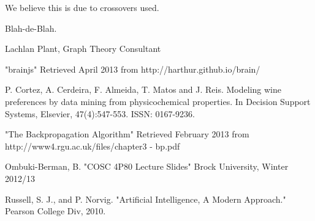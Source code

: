 \documentclass[journal]{IEEEtran}
\begin{document}
We believe this is due to crossovers used.

Blah-de-Blah.





\begin{thebibliography}{1}

Lachlan Plant, Graph Theory Consultant

"brainjs" Retrieved April 2013 from
http://harthur.github.io/brain/

  P. Cortez, A. Cerdeira, F. Almeida, T. Matos and J. Reis.
  Modeling wine preferences by data mining from physicochemical properties.
  In Decision Support Systems, Elsevier, 47(4):547-553. ISSN: 0167-9236.

"The Backpropagation Algorithm" Retrieved February 2013 from
http://www4.rgu.ac.uk/files/chapter3 - bp.pdf

Ombuki-Berman, B. "COSC 4P80 Lecture Slides" Brock University, Winter 2012/13

Russell, S. J., and P. Norvig. "Artificial Intelligence, A Modern Approach." Pearson College Div, 2010.

\end{thebibliography}


\end{document}
